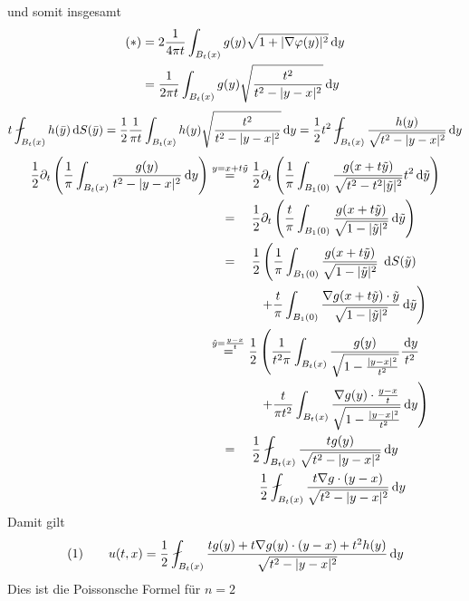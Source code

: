 \begin{bemerkung}
\begin{enumerate}[(i)]
\[		\]
		und somit insgesamt
		\begin{align*}
			(*) &= 2 \frac{1}{4 \pi t} \int_{B_t(x)}^{} g(y) \sqrt{1+ \lvert \nabla \varphi(y)\rvert^2} \,\mathrm{d}y \\
			&= \frac{1}{2 \pi t} \int_{B_t(x)}^{} g(y) \sqrt{\frac{t^2}{t^2-\lvert y-x\rvert^2}} \,\mathrm{d}y 
		\end{align*}
		\[
			t \fint_{B_t(x)}^{} h( \bar{y}) \,\mathrm{d}S(\bar{y}) 
			= \frac{1}{2} \frac{1}{\pi t} \int_{B_t(x)}^{} h(y) \sqrt{\frac{t^2}{t^2 - \abs{y-x}^2}} \,\mathrm{d}y 
			= \frac{1}{2} t^2 \fint_{B_t(x)}^{} \frac{h(y)}{\sqrt{t^2-\abs{y-x}^2}} \,\mathrm{d}y
		\]
		\begin{align*}
			\frac{1}{2} \partial_t \left( \frac{1}{\pi} \int_{B_t(x)}^{} \frac{g(y)}{t^2-\abs{y-x}^2} \,\mathrm{d}y \right) & \stackrel{y = x + t \tilde y}{=} 
			\frac{1}{2} \partial_t \left( \frac{1}{\pi} \int_{B_1(0)}^{} \frac{g(x + t \tilde y)}{\sqrt{t^2 - t^2 \abs{\tilde y}^2}}t^2 \,\mathrm{d} \tilde y \right) \\
			& \stackrel{\hphantom{y = x + t \tilde y}}{=} 
			\frac{1}{2} \partial_t \left(  \frac{t}{ \pi} \int_{B_1(0)}^{} \frac{g(x+ t \tilde y)}{\sqrt{1- \abs{ \tilde y}^2}} \,\mathrm{d} \tilde y \right) \\
			& \stackrel{\hphantom{y = x + t \tilde y}}{=} \frac{1}{2} \left( \frac{1}{\pi} \int_{B_1(0)}^{} \frac{g(x+ t \tilde y)}{\sqrt{1 - \abs{ \tilde y}^2}} 
			\right. \,\mathrm{d}S( \tilde y) \\ & \qquad \qquad  \left .
		+ \frac{t}{\pi} \int_{B_1(0)}^{} \frac{ \nabla  g(x+ t \tilde y) \cdot \tilde y}{\sqrt{1- \abs{ \tilde y}^2}} \,\mathrm{d} \tilde y \right) \\
			 & \stackrel{\hat{y}= \frac{y-x}{t}}{=} \frac{1}{2} \left( \frac{1}{t^2 \pi} \int_{B_t(x)}^{} \frac{g(y)}{ \sqrt{1- \frac{\abs{y-x}^2}{t^2}}}
		 \frac{\,\mathrm{d}y}{t^2} \right. \hphantom{)} \\ & \qquad \qquad  \left. + \frac{t}{\pi t^2} \int_{B_t(x)}^{} \frac{ \nabla g(y) \cdot \frac{y-x}{t}}{\sqrt{1-\frac{\abs{y-x}^2}{t^2}}} 
			 \,\mathrm{d}y \right) \\
			 & \stackrel{\hphantom{y = x + t \tilde y}}{=} \frac{1}{2} \fint_{B_t(x)}^{} \frac{t g(y)}{ \sqrt{t^2 - \abs{y-x}^2}} \,\mathrm{d}y \\
			 & \qquad \qquad \frac{1}{2} \fint_{B_t(x)}^{} \frac{t  \nabla g \cdot (y-x)}{\sqrt{t^2 - \abs{y-x}^2}} \,\mathrm{d}y
		\end{align*}
		Damit gilt
		\[
			(1)\qquad u(t,x)= \frac{1}{2} \fint_{B_t(x)}^{} \frac{t g(y) + t  \nabla g(y) \cdot (y-x) + t^2 h(y)}{\sqrt{t^2 - \abs{y-x}^2}} \,\mathrm{d}y
		\]
		Dies ist die Poissonsche Formel für $n=2$
	\end{enumerate}
\end{bemerkung}

